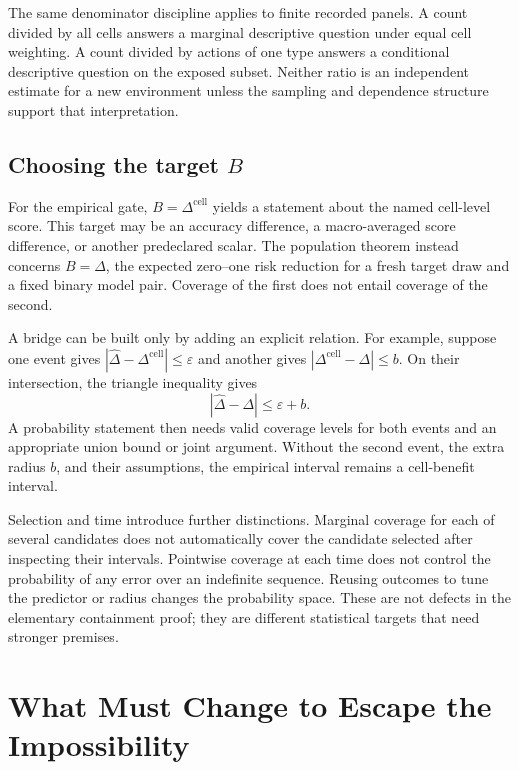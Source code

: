The same denominator discipline applies to finite recorded panels.  A count divided by all cells
answers a marginal descriptive question under equal cell weighting.  A count divided by actions of
one type answers a conditional descriptive question on the exposed subset.  Neither ratio is an
independent estimate for a new environment unless the sampling and dependence structure support
that interpretation.

\subsection{Choosing the target \texorpdfstring{$B$}{B}}
\label{fr:subsec-choosing-B}

For the empirical gate, $B=\Delta^{\mathrm{cell}}$ yields a statement about the named cell-level
score.  This target may be an accuracy difference, a macro-averaged score difference, or another
predeclared scalar.  The population theorem instead concerns $B=\Delta$, the expected zero--one
risk reduction for a fresh target draw and a fixed binary model pair.  Coverage of the first does
not entail coverage of the second.

A bridge can be built only by adding an explicit relation.  For example, suppose one event gives
$|\widehat\Delta-\Delta^{\mathrm{cell}}|\le\varepsilon$ and another gives
$|\Delta^{\mathrm{cell}}-\Delta|\le b$.  On their intersection, the triangle inequality gives
\begin{equation}
  |\widehat\Delta-\Delta|\le\varepsilon+b.
  \label{fr:eq-cell-population-bridge}
\end{equation}
A probability statement then needs valid coverage levels for both events and an appropriate union
bound or joint argument.  Without the second event, the extra radius $b$, and their assumptions,
the empirical interval remains a cell-benefit interval.

Selection and time introduce further distinctions.  Marginal coverage for each of several
candidates does not automatically cover the candidate selected after inspecting their intervals.
Pointwise coverage at each time does not control the probability of any error over an indefinite
sequence.  Reusing outcomes to tune the predictor or radius changes the probability space.  These
are not defects in the elementary containment proof; they are different statistical targets that
need stronger premises.

\section{What Must Change to Escape the Impossibility}
\label{fr:sec-escape}

